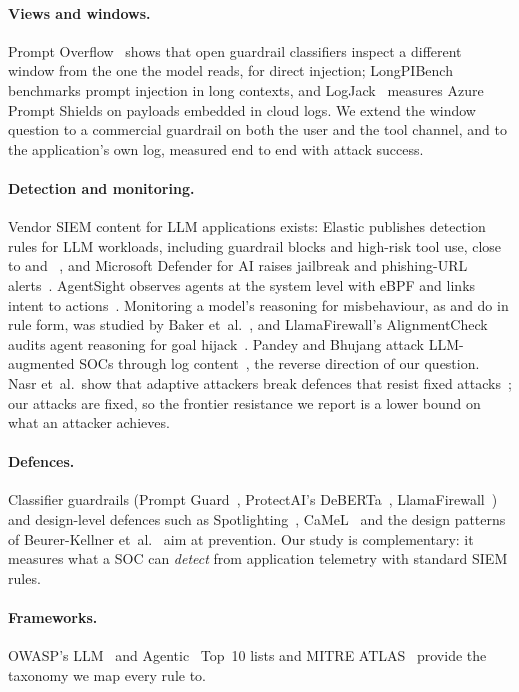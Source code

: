 \paragraph{Views and windows.} Prompt Overflow~\cite{prompt-overflow} shows that open guardrail
classifiers inspect a different window from the one the model reads, for direct injection;
LongPIBench~\cite{longpibench} benchmarks prompt injection in long contexts, and LogJack~\cite{logjack}
measures Azure Prompt Shields on payloads embedded in cloud logs. We extend the window question to a
commercial guardrail on both the user and the tool channel, and to the application's own log, measured
end to end with attack success.

\paragraph{Detection and monitoring.} Vendor SIEM content for LLM applications exists: Elastic
publishes detection rules for LLM workloads, including guardrail blocks and high-risk tool use, close
to  and ~\cite{elastic-llm}, and Microsoft Defender for AI raises jailbreak and
phishing-URL alerts~\cite{defender-ai}. AgentSight observes agents at the system level with eBPF and
links intent to actions~\cite{agentsight}. Monitoring a model's reasoning for misbehaviour, as
 and  do in rule form, was studied by Baker et~al.~\cite{cot-monitor}, and
LlamaFirewall's AlignmentCheck audits agent reasoning for goal hijack~\cite{llamafirewall}. Pandey
and Bhujang attack LLM-augmented SOCs through log content~\cite{watchtower}, the reverse direction of
our question. Nasr et~al.\ show that adaptive attackers break defences that resist fixed
attacks~\cite{attacker-moves-second}; our attacks are fixed, so the frontier resistance we report is a
lower bound on what an attacker achieves.

\paragraph{Defences.} Classifier guardrails (Prompt Guard~\cite{promptguard}, ProtectAI's
DeBERTa~\cite{protectai}, LlamaFirewall~\cite{llamafirewall}) and design-level defences such as
Spotlighting~\cite{spotlighting}, CaMeL~\cite{camel} and the design patterns of Beurer-Kellner
et~al.~\cite{design-patterns} aim at prevention. Our study is complementary: it measures what a SOC
can \emph{detect} from application telemetry with standard SIEM rules.

\paragraph{Frameworks.} OWASP's LLM~\cite{owasp-llm-2025} and Agentic~\cite{owasp-agentic-2026} Top~10
lists and MITRE ATLAS~\cite{atlas} provide the taxonomy we map every rule to.
